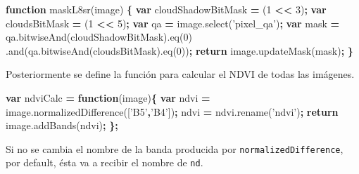 \documentclass[
]{article}
\newenvironment{Shaded}{\begin{snugshade}}{\end{snugshade}}
\newcommand{\AttributeTok}[1]{\textcolor[rgb]{0.77,0.63,0.00}{#1}}
\newcommand{\ControlFlowTok}[1]{\textcolor[rgb]{0.13,0.29,0.53}{\textbf{#1}}}
\newcommand{\DecValTok}[1]{\textcolor[rgb]{0.00,0.00,0.81}{#1}}
\newcommand{\KeywordTok}[1]{\textcolor[rgb]{0.13,0.29,0.53}{\textbf{#1}}}
\newcommand{\NormalTok}[1]{#1}
\newcommand{\OperatorTok}[1]{\textcolor[rgb]{0.81,0.36,0.00}{\textbf{#1}}}
\newcommand{\StringTok}[1]{\textcolor[rgb]{0.31,0.60,0.02}{#1}}
\newcommand{\VariableTok}[1]{\textcolor[rgb]{0.00,0.00,0.00}{#1}}
\begin{document}
\begin{Shaded}
\begin{Highlighting}[]
\KeywordTok{function} \AttributeTok{maskL8sr}\NormalTok{(image) }\OperatorTok{\{}
  \KeywordTok{var}\NormalTok{ cloudShadowBitMask }\OperatorTok{=}\NormalTok{ (}\DecValTok{1} \OperatorTok{<<} \DecValTok{3}\NormalTok{)}\OperatorTok{;}
  \KeywordTok{var}\NormalTok{ cloudsBitMask }\OperatorTok{=}\NormalTok{ (}\DecValTok{1} \OperatorTok{<<} \DecValTok{5}\NormalTok{)}\OperatorTok{;}
  \KeywordTok{var}\NormalTok{ qa }\OperatorTok{=} \VariableTok{image}\NormalTok{.}\AttributeTok{select}\NormalTok{(}\StringTok{'pixel_qa'}\NormalTok{)}\OperatorTok{;}
  \KeywordTok{var}\NormalTok{ mask }\OperatorTok{=} \VariableTok{qa}\NormalTok{.}\AttributeTok{bitwiseAnd}\NormalTok{(cloudShadowBitMask).}\AttributeTok{eq}\NormalTok{(}\DecValTok{0}\NormalTok{)}
\NormalTok{                 .}\AttributeTok{and}\NormalTok{(}\VariableTok{qa}\NormalTok{.}\AttributeTok{bitwiseAnd}\NormalTok{(cloudsBitMask).}\AttributeTok{eq}\NormalTok{(}\DecValTok{0}\NormalTok{))}\OperatorTok{;}
  \ControlFlowTok{return} \VariableTok{image}\NormalTok{.}\AttributeTok{updateMask}\NormalTok{(mask)}\OperatorTok{;}
\OperatorTok{\}}
\end{Highlighting}
\end{Shaded}

Posteriormente se define la función para calcular el NDVI de todas las
imágenes.

\begin{Shaded}
\begin{Highlighting}[]
\KeywordTok{var}\NormalTok{ ndviCalc }\OperatorTok{=} \KeywordTok{function}\NormalTok{(image)}\OperatorTok{\{}
  \KeywordTok{var}\NormalTok{ ndvi }\OperatorTok{=} \VariableTok{image}\NormalTok{.}\AttributeTok{normalizedDifference}\NormalTok{([}\StringTok{'B5'}\OperatorTok{,}\StringTok{'B4'}\NormalTok{])}\OperatorTok{;}
\NormalTok{  ndvi }\OperatorTok{=} \VariableTok{ndvi}\NormalTok{.}\AttributeTok{rename}\NormalTok{(}\StringTok{'ndvi'}\NormalTok{)}\OperatorTok{;}
    \ControlFlowTok{return} \VariableTok{image}\NormalTok{.}\AttributeTok{addBands}\NormalTok{(ndvi)}\OperatorTok{;}
\OperatorTok{\};}
\end{Highlighting}
\end{Shaded}

\begin{tipblock}
Si no se cambia el nombre de la banda producida por
\texttt{normalizedDifference}, por default, ésta va a recibir el nombre
de \texttt{nd}.

\end{tipblock}
\end{document}
